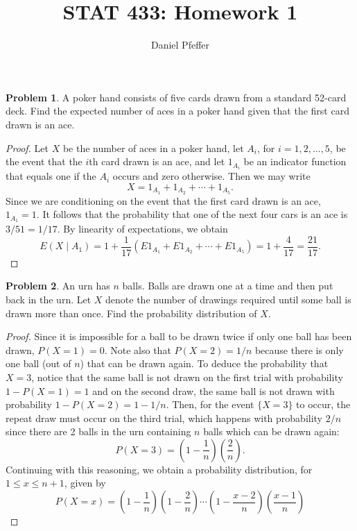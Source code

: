 \documentclass[oneside,reqno]{amsart}
\title{STAT 433: Homework 1}
\author{Daniel Pfeffer}
\theoremstyle{definition}
\newtheorem{prob}{Problem}
\begin{document}
\maketitle


\begin{prob}
A poker hand consists of five cards drawn from a standard 52-card deck. Find the expected number of aces in a poker hand given that the first card drawn is an ace.
\end{prob}


\begin{proof}
Let $X$ be the number of aces in a poker hand, let $A_i$, for $i=1,2,\dotsc,5$, be the event that the $i$th card drawn is an ace, and let $1_{A_i}$ be an indicator function that equals one if the $A_i$ occurs and zero otherwise. Then we may write
\[
	X = 1_{A_1} + 1_{A_2} + \cdots + 1_{A_5}.
\]
Since we are conditioning on the event that the first card drawn is an ace, $1_{A_1} = 1$. It follows that the probability that one of the next four cars is an ace is $3/51 = 1/17$. By linearity of expectations, we obtain
\[
	E (X\mid A_1) = 1 + \frac{1}{17} (E 1_{A_1} + E  1_{A_2} + \cdots + E 1_{A_5})   
	= 1 + \frac{4}{17} 
	= \frac{21}{17}.
\]
\end{proof}


\begin{prob}
An urn has $n$ balls. Balls are drawn one at a time and then put back in the urn. Let $X$ denote the number of drawings required until some ball is drawn more than once. Find the probability distribution of $X$.
\end{prob}

\begin{proof}
Since it is impossible for a ball to be drawn twice if only one ball has been drawn, $P(X=1) = 0$. Note also that $P(X=2) = 1/n$ because there is only one ball (out of $n$) that can be drawn again. To deduce the probability that $X=3$, notice that the same ball is not drawn on the first trial with probability $1-P(X=1) = 1$ and on the second draw, the same ball is not drawn with probability $1-P(X=2) = 1-1/n$. Then, for the event $\{X=3\}$ to occur, the repeat draw must occur on the third trial, which happens with probability $2/n$ since there are 2 balls in the urn containing $n$ balls which can be drawn again:
\[
	P(X=3) =\left(1 - \frac{1}{n}\right)\left( \frac{2}{n}\right).
\]
Continuing with this reasoning, we obtain a probability distribution, for $1 \leq x \leq n+1$, given by
\[
	P(X=x) =\left(1-\frac{1}{n}\right)\left(1-\frac{2}{n}\right) \cdots\left(1-\frac{x-2}{n}\right) \left(\frac{x-1}{n}\right)
\]
\end{proof}
\end{document}
